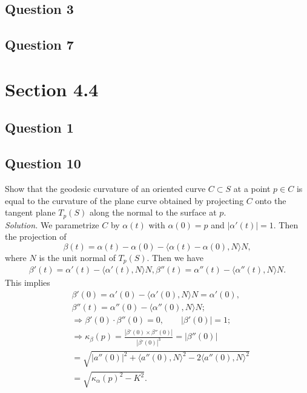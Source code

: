 \documentclass[12pt]{article}
\begin{document}
\subsection*{Question 3}

\subsection*{Question 7}

\section*{Section 4.4}
\subsection*{Question 1}

\subsection*{Question 10}
Show that the geodesic curvature of an oriented curve $C \subset S$ at a point $p \in C$ is equal to the curvature of the plane curve obtained by projecting $C$ onto the tangent plane $T_p(S)$ along the normal to the surface at $p$.\\

\textit{Solution.} We parametrize $C$ by $\alpha(t)$ with $\alpha(0)=p$ and $|\alpha'(t)|=1$. Then the projection of 
\begin{equation*}
    \beta(t) = \alpha(t)-\alpha(0) - \langle\alpha(t)-\alpha(0),N\rangle N,
\end{equation*}
where $N$ is the unit normal of $T_p(S)$. Then we have\begin{align*}
    \beta'(t) = \alpha'(t) - \langle\alpha'(t),N\rangle N,
    \beta''(t) = \alpha''(t) - \langle\alpha''(t),N\rangle N.
\end{align*} 
This implies \begin{align*}
    &\beta'(0) = \alpha'(0) - \langle\alpha'(0),N\rangle N = \alpha'(0),\\
    &\beta''(t) = \alpha''(0) - \langle \alpha''(0),N\rangle N;\\
    &\Rightarrow  \beta'(0)\cdot \beta''(0)= 0,\qquad |\beta'(0)|=1;\\
    &\Rightarrow  \kappa_{\beta}(p) =  \frac{|\beta'(0)\times\beta''(0)|}{|\beta'(0)|^3}=|\beta''(0)|\\
    &= \sqrt{|a''(0)|^2+\langle a''(0),N\rangle^2-2\langle a''(0),N\rangle^2}\\
    &=\sqrt{\kappa_\alpha(p)^2-K^2}.
\end{align*}
\end{document}
